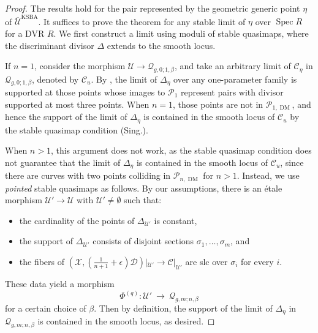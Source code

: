 \documentclass[a4paper,12pt]{amsart}
\newcommand{\ove}[1]{\overline{#1}}
\newcommand{\cQ}{\mathcal{Q}}
\DeclareMathOperator{\Spec}{Spec}
\DeclareMathOperator{\KSBA}{\mathrm{KSBA}}
\newcommand{\sY}{{\mathscr{Y}}}
\newcommand{\sP}{{\mathscr{P}}}
\newcommand{\sD}{{\mathscr{D}}}
\newcommand{\sX}{{\mathscr{X}}}
\newcommand{\sC}{{\mathscr{C}}}
\newcommand{\cX}{{\mathcal{X}}}
\newcommand{\cU}{{\mathcal{U}}}
\newcommand\cD{{\mathcal{D}}}
\newcommand\cC{{\mathcal{C}}}
\newcommand{\dm}{{\operatorname{DM}}}
\theoremstyle{definition}
\theoremstyle{remark}
\begin{document}
 \begin{proof} 

The results hold for the pair represented by the geometric generic point $\eta$ of $\ove{\cU}^{\KSBA}$. It suffices to prove the theorem for any stable limit of $\eta$ over $\Spec R$ for a DVR $R$. We first construct a limit using moduli of stable quasimaps, where the discriminant divisor $\Delta$ extends to the smooth locus.
 

If $n=1$, consider the morphism $\cU\to \cQ_{g,0;1,\beta}$, and take an arbitrary limit of $\sC_{\eta}$ in $\cQ_{g,0;1,\beta}$, denoted by $\sC_u$. By , the limit of $\Delta_{\eta}$ over any one-parameter family is supported at those points whose images to $\sP_1$ represent pairs with divisor supported at most three points. When $n=1$, those points are not in $\sP_{1,\dm}$, and hence the support of the limit of $\Delta_{\eta}$ is contained in the smooth locus of $\sC_u$ by the stable quasimap condition (Sing.).

When $n>1$, this argument does not work, as the stable quasimap condition does not guarantee that the limit of $\Delta_\eta$ is contained in the smooth locus of $\sC_u$, since there are curves with two points colliding in $\sP_{n,\dm}$ for $n>1$. Instead, we use \textit{pointed} stable quasimaps as follows. 
     By our assumptions, there is an \'etale morphism $\cU'\to \cU$ with $\cU'\neq\emptyset$ such that:
 \begin{itemize}
     \item the cardinality of the points of $\Delta_{\cU'}$ is constant,
     \item the support of $\Delta_{\cU'}$ consists of disjoint sections $\sigma_1,\ldots,\sigma_m$, and
     \item the fibers of $(\sX,(\frac{1}{n+1}+\epsilon)\sD)|_{\cU'}\to \sC|_{\cU'}$ are slc over $\sigma_i$ for every $i$.
 \end{itemize}
These data yield a morphism $$\Phi^{(q)}\colon \cU' \ \longrightarrow \  \cQ_{g,m;n,\beta}$$ for a certain choice of $\beta$. Then by definition, the support of the limit of $\Delta_{\eta}$ in $\cQ_{g,m;n,\beta}$ is contained in the smooth locus, as desired.



\end{proof}
\end{document}
